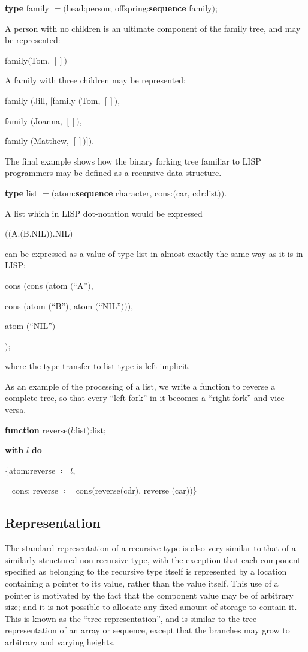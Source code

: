 \documentclass[twoside,11pt]{book}
\begin{document}
\quad \textbf{type} family $= ($head:person; offspring:\textbf{sequence} family$)$;

A person with no children is an ultimate component of the family tree, and may be represented:

\quad family$($Tom, $[])$

\noindent
A family with three children may be represented:

\noindent
family $($Jill, $[$family $($Tom, $[])$,

\tabto{3.2em} family $($Joanna, $[])$,

\tabto{3.2em} family $($Matthew, $[])])$.

The final example shows how the binary forking tree familiar to LISP programmers may be defined as a recursive data structure.

\quad \textbf{type} list $= ($atom:\textbf{sequence} character, cons:$($car, cdr:list$))$.

\noindent
A list which in LISP dot-notation would be expressed

\quad $(($A.$($B.NIL$))$.NIL$)$

\noindent
can be expressed as a value of type list in almost exactly the same way as it is in LISP:

\quad cons $($cons $($atom $($``A''$)$,

\tabto{5em} cons $($atom $($``B''$)$, atom $($``NIL''$)))$,

\tabto{5em} atom $($``NIL''$)$

\tabto{4.8em} $)$;

\noindent
where the type transfer to list type is left implicit.

As an example of the processing of a list, we write a function to reverse a complete tree, so that every ``left fork'' in it becomes a ``right fork'' and vice-versa.

\quad \textbf{function} reverse$(l$:list$)$:list;

\quad \quad \textbf{with} $l$ \textbf{do}

\quad \quad \quad $\{$atom:reverse $\coloneq l$,

\quad \quad \quad ~ cons: reverse $\coloneq$ cons$($reverse$($cdr$)$, reverse $($car$))\}$

\subsection{Representation}

The standard representation of a recursive type is also very similar to that of a similarly structured non-recursive type, with the exception that each component specified as belonging to the recursive type itself is represented by a location containing a pointer to its value, rather than the value itself. This use of a pointer is motivated by the fact that the component value may be of arbitrary size; and it is not possible to allocate any fixed amount of storage to contain it. This is known as the ``tree representation'', and is similar to the tree representation of an array or sequence, except that the branches may grow to arbitrary and varying heights.
\end{document}
